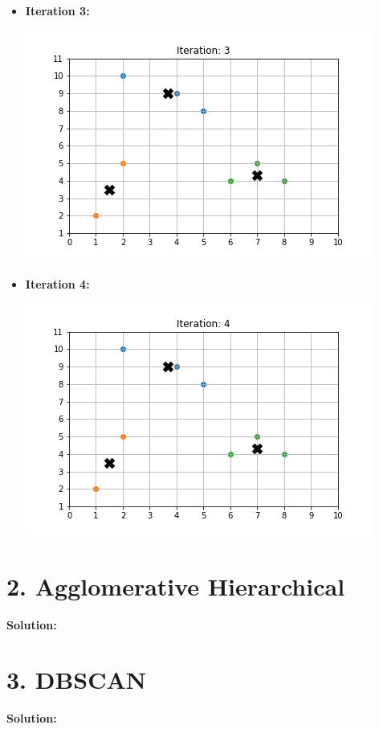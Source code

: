\documentclass[11pt]{article}
\begin{document}
\begin{itemize}
		\item \textbf{Iteration 3:} \\
		\begin{center}
			\includegraphics[scale=0.7]{kmeans_graphs/iteration_3.png}
		\end{center}
		
		\item \textbf{Iteration 4:} \\
		\begin{center}
			\includegraphics[scale=0.7]{kmeans_graphs/iteration_4.png}
		\end{center}
    \end{itemize}
	\newpage
	
	\section*{2. Agglomerative Hierarchical}

	\textbf{Solution:}\\
	\newpage
	
	
	\section*{3. DBSCAN}

	\textbf{Solution:}\\
	\newpage
\end{document}
